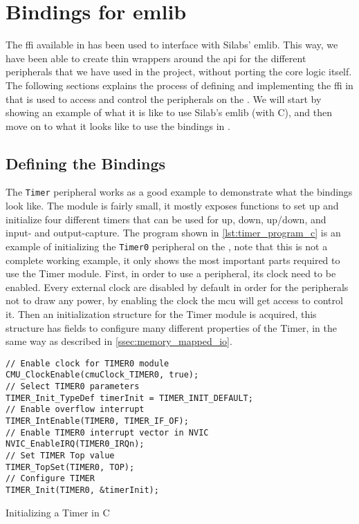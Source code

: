 
\section{Bindings for emlib}
\label{sub:interfacing_with_emlib}

The \gls{ffi} available in \rust has been used to interface with Silabs' emlib.
This way, we have been able to create thin wrappers around the \gls{api} for the different peripherals that we have used in the project, without porting the core logic itself.
The following sections explains the process of defining and implementing the \gls{ffi} in \rust that is used to access and control the peripherals on the \gecko.
We will start by showing an example of what it is like to use Silab's emlib (with C), and then move on to what it looks like to use the bindings in \rust.

\subsection{Defining the Bindings}

The \texttt{Timer} peripheral \cite{an0014_timer} works as a good example to demonstrate what the \rust bindings look like.
The module is fairly small, it mostly exposes functions to set up and initialize four different timers that can be used for up, down, up/down, and input- and output-capture.
The program shown in \autoref{lst:timer_program_c} is an example of initializing the \texttt{Timer0} peripheral on the \gecko, note that this is not a complete working example, it only shows the most important parts required to use the Timer module.
First, in order to use a peripheral, its clock need to be enabled.
Every external clock are disabled by default  in order for the peripherals not to draw any power, by enabling the clock the \gls{mcu} will get access to control it.
Then an initialization structure for the Timer module is acquired, this structure has fields to configure many different properties of the Timer, in the same way as described in \autoref{ssec:memory_mapped_io}.

\begin{listing}[h]
\begin{verbatim}
// Enable clock for TIMER0 module
CMU_ClockEnable(cmuClock_TIMER0, true);
// Select TIMER0 parameters
TIMER_Init_TypeDef timerInit = TIMER_INIT_DEFAULT;
// Enable overflow interrupt
TIMER_IntEnable(TIMER0, TIMER_IF_OF);
// Enable TIMER0 interrupt vector in NVIC
NVIC_EnableIRQ(TIMER0_IRQn);
// Set TIMER Top value
TIMER_TopSet(TIMER0, TOP);
// Configure TIMER
TIMER_Init(TIMER0, &timerInit);
\end{verbatim}
\caption{Initializing a Timer in C}
\label{lst:timer_program_c}
\end{listing}

